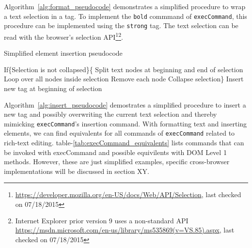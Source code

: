 
Algorithm~\ref{alg:format_pseudocode} demonstrates a simplified procedure to wrap a text selection in a tag. To implement the \texttt{bold} commmand of \texttt{execCommand}, this procedure can be implemented using the \texttt{strong} tag. The text selection can be read with the browser's selection API\footnote{\url{https://developer.mozilla.org/en-US/docs/Web/API/Selection}, last checked on 07/18/2015}\footnote{Internet Explorer prior version 9 uses a non-standard API \url{https://msdn.microsoft.com/en-us/library/ms535869(v=VS.85).aspx}, last checked on 07/18/2015}.


\begin{algorithm}
\caption{Simplified element insertion pseudocode}
\label{alg:insert_pseudocode}
\begin{algorithmic}[1]
\State If\{Selection is not collapsed\}\{
\State Split text nodes at beginning and end of selection
\State Loop over all nodes inside selection
\State Remove each node
\State Collapse selection\}
\State Insert new tag at beginning of selection
\end{algorithmic}
\end{algorithm}

Algorithm~\ref{alg:insert_pseudocode} demostrates a simplified procedure to insert a new tag and possibly overwriting the current text selection and thereby mimicking \texttt{execCommand}'s insertion command. With formatting text and inserting elements, we can find equivalents for all commands of \texttt{execCommand} related to rich-text editing. table-\ref{tab:execCommand_equivalents} lists commands that can be invoked with execCommand and possible equivilents with DOM Level 1 methods. However, these are just simplified examples, specific cross-browser implementations  will be discussed in section XY.


